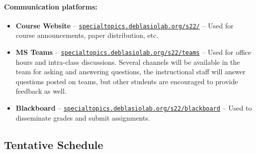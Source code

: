 \documentclass[12pt]{scrartcl}
\begin{document}
\paragraph{Communication platforms:}
\begin{itemize}
\item \textbf{Course Website} -- \href{https://specialtopics.deblasiolab.org/s22/}{\texttt{specialtopics.deblasiolab.org/s22/}} -- Used for course announcements, paper distribution, etc. 
\item \textbf{MS Teams} -- \href{https://specialtopics.deblasiolab.org/s22/teams}{\texttt{specialtopics.deblasiolab.org/s22/teams}}  -- Used for office hours and intra-class discussions. Several channels will be available in the team for asking and answering questions, the instructional staff will answer questions posted on teams, but other students are encouraged to provide feedback as well. 
\item \textbf{Blackboard} -- \href{https://specialtopics.deblasiolab.org/s22/blackboard}{\texttt{specialtopics.deblasiolab.org/s22/blackboard}} -- Used to disseminate grades and submit assignments.
\end{itemize}
 
\clearpage
 
\subsection{Tentative Schedule}
\end{document}
